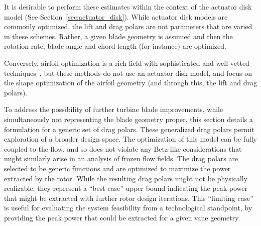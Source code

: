 It is desirable to perform these estimates within the context of the
actuator disk model (See Section~\ref{sec:actuator_disk}). While
actuator disk models are commonly
optimized\cite{790585,WE:WE487,en5093425,adkins1983design}, the lift and
drag polars are not parameters that are varied in these schemes. Rather,
a given blade geometry is assumed and then the rotation rate, blade
angle and chord length (for instance) are optimized.   

Conversely, airfoil optimization is a rich field with sophisticated and
well-vetted
techniques~\cite{drela1998pros,lewis2001aerodynamic,Chehouri2015361}, 
but these methods do not use an actuator disk model, and focus on the
shape optimization of the airfoil geometry (and through this, the lift
and drag polars). 

To address the possibility of further turbine blade
improvements, while simultaneously not representing the blade geometry
proper, this section details a formulation for a generic set of drag
polars. These generalized drag polars permit exploration of a broader
design space. The optimization of this model can be fully coupled to the
flow, and so does not violate any Betz-like considerations that might
similarly arise in an analysis of frozen flow fields.
The drag polars are selected to be generic functions and are optimized to
maximize the power extracted by the rotor. While the resulting drag
polars might not be physically  realizable, they represent a ``best
case'' upper bound indicating the peak power that might be extracted
with further rotor design iterations. This ``limiting case'' is useful
for evaluating the system feasibility from a technological standpoint,
by providing the peak power that could be extracted for a given vane
geometry. 

